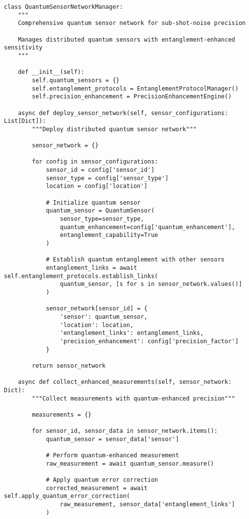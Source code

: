 \documentclass[12pt,a4paper]{report}
\begin{document}
\begin{lstlisting}
class QuantumSensorNetworkManager:
    """
    Comprehensive quantum sensor network for sub-shot-noise precision

    Manages distributed quantum sensors with entanglement-enhanced sensitivity
    """

    def __init__(self):
        self.quantum_sensors = {}
        self.entanglement_protocols = EntanglementProtocolManager()
        self.precision_enhancement = PrecisionEnhancementEngine()

    async def deploy_sensor_network(self, sensor_configurations: List[Dict]):
        """Deploy distributed quantum sensor network"""

        sensor_network = {}

        for config in sensor_configurations:
            sensor_id = config['sensor_id']
            sensor_type = config['sensor_type']
            location = config['location']

            # Initialize quantum sensor
            quantum_sensor = QuantumSensor(
                sensor_type=sensor_type,
                quantum_enhancement=config['quantum_enhancement'],
                entanglement_capability=True
            )

            # Establish quantum entanglement with other sensors
            entanglement_links = await self.entanglement_protocols.establish_links(
                quantum_sensor, [s for s in sensor_network.values()]
            )

            sensor_network[sensor_id] = {
                'sensor': quantum_sensor,
                'location': location,
                'entanglement_links': entanglement_links,
                'precision_enhancement': config['precision_factor']
            }

        return sensor_network

    async def collect_enhanced_measurements(self, sensor_network: Dict):
        """Collect measurements with quantum-enhanced precision"""

        measurements = {}

        for sensor_id, sensor_data in sensor_network.items():
            quantum_sensor = sensor_data['sensor']

            # Perform quantum-enhanced measurement
            raw_measurement = await quantum_sensor.measure()

            # Apply quantum error correction
            corrected_measurement = await self.apply_quantum_error_correction(
                raw_measurement, sensor_data['entanglement_links']
            )


\end{lstlisting}
\end{document}
